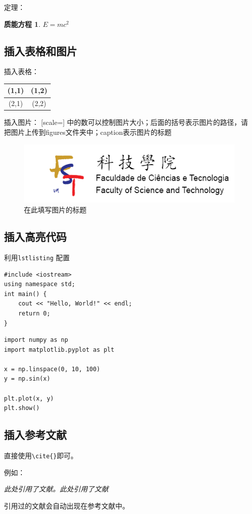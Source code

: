 \documentclass[12pt,hyperref,a4paper,UTF8]{ctexart}
\begin{document}
定理：
\newtheorem{mass-energy equivalence}{质能方程}[section]
\begin{mass-energy equivalence} \label{thm:1}
$E = mc^2$
\end{mass-energy equivalence}

\subsection{插入表格和图片}
插入表格：
\begin{table}[h]
    \begin{tabular}{|c|c|}%
        \hline  %
        (1,1) & (1,2) \\
        \hline  %
        (2,1) & (2,2) \\
        \hline %
    \end{tabular}
\end{table}

插入图片：
[scale=] 中的数可以控制图片大小；后面的括号表示图片的路径，请把图片上传到figures文件夹中；caption表示图片的标题
\begin{figure}[h]
    \centering
    \includegraphics[scale=0.1]{figures/FST-logo.png}
    \caption{在此填写图片的标题}
\end{figure}

\subsection{插入高亮代码}
利用\verb|lstlisting| 配置
\begin{lstlisting}[style=CPP, title="c++代码"]
#include <iostream>
using namespace std;
int main() {
    cout << "Hello, World!" << endl;
    return 0;
}

\end{lstlisting}

\begin{lstlisting}[style=Python, title="Python代码"]
import numpy as np
import matplotlib.pyplot as plt

x = np.linspace(0, 10, 100)
y = np.sin(x)

plt.plot(x, y)
plt.show()
\end{lstlisting}

\subsection{插入参考文献}
直接使用\verb|\cite{}|即可。

例如：


   \textit{ 此处引用了文献\cite{liu2023backdoor}。此处引用了文献\cite{du2024sequential}}


引用过的文献会自动出现在参考文献中。



\end{document}
